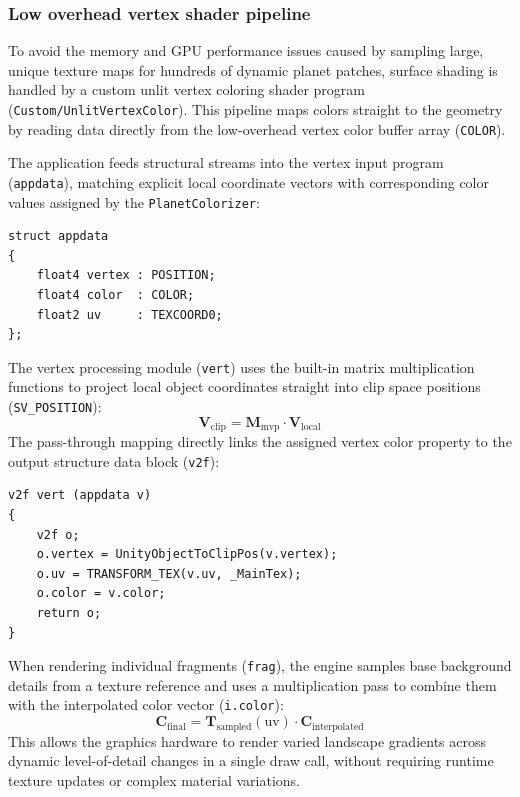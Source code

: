 \documentclass[12pt]{report}
\begin{document}
\subsubsection{Low overhead vertex shader pipeline}
To avoid the memory and GPU performance issues caused by sampling large, unique texture maps for hundreds of dynamic planet patches, surface shading is handled by a custom unlit vertex coloring shader program (\texttt{Custom/UnlitVertexColor}). This pipeline maps colors straight to the geometry by reading data directly from the low-overhead vertex color buffer array (\texttt{COLOR}).

The application feeds structural streams into the vertex input program (\texttt{appdata}), matching explicit local coordinate vectors with corresponding color values assigned by the \texttt{PlanetColorizer}:
\begin{verbatim}
struct appdata
{
    float4 vertex : POSITION;
    float4 color  : COLOR;
    float2 uv     : TEXCOORD0;
};
\end{verbatim}

The vertex processing module (\texttt{vert}) uses the built-in matrix multiplication functions to project local object coordinates straight into clip space positions (\texttt{SV\_POSITION}):
\begin{equation}
\mathbf{V}_{\text{clip}} = \mathbf{M}_{\text{mvp}} \cdot \mathbf{V}_{\text{local}}
\end{equation}
The pass-through mapping directly links the assigned vertex color property to the output structure data block (\texttt{v2f}):
\begin{verbatim}
v2f vert (appdata v)
{
    v2f o;
    o.vertex = UnityObjectToClipPos(v.vertex);
    o.uv = TRANSFORM_TEX(v.uv, _MainTex);
    o.color = v.color;
    return o;
}
\end{verbatim}

When rendering individual fragments (\texttt{frag}), the engine samples base background details from a texture reference and uses a multiplication pass to combine them with the interpolated color vector (\texttt{i.color}):
\begin{equation}
\mathbf{C}_{\text{final}} = \mathbf{T}_{\text{sampled}}(\text{uv}) \cdot \mathbf{C}_{\text{interpolated}}
\end{equation}
This allows the graphics hardware to render varied landscape gradients across dynamic level-of-detail changes in a single draw call, without requiring runtime texture updates or complex material variations.
\end{document}
